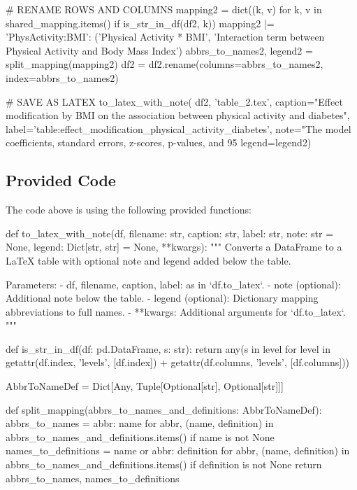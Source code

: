 \documentclass[11pt]{article}
\begin{document}
\begin{python}
# RENAME ROWS AND COLUMNS
mapping2 = dict((k, v) for k, v in shared_mapping.items() if is_str_in_df(df2, k))
mapping2 |= {
    'PhysActivity:BMI': ('Physical Activity * BMI', 'Interaction term between Physical Activity and Body Mass Index')
}
abbrs_to_names2, legend2 = split_mapping(mapping2)
df2 = df2.rename(columns=abbrs_to_names2, index=abbrs_to_names2)

# SAVE AS LATEX
to_latex_with_note(
    df2, 'table_2.tex',
    caption="Effect modification by BMI on the association between physical activity and diabetes", 
    label='table:effect_modification_physical_activity_diabetes',
    note="The model coefficients, standard errors, z-scores, p-values, and 95%
    legend=legend2)

\end{python}

\subsection{Provided Code}
The code above is using the following provided functions:

\begin{python}
def to_latex_with_note(df, filename: str, caption: str, label: str, note: str = None, legend: Dict[str, str] = None, **kwargs):
    """
    Converts a DataFrame to a LaTeX table with optional note and legend added below the table.

    Parameters:
    - df, filename, caption, label: as in `df.to_latex`.
    - note (optional): Additional note below the table.
    - legend (optional): Dictionary mapping abbreviations to full names.
    - **kwargs: Additional arguments for `df.to_latex`.
    """

def is_str_in_df(df: pd.DataFrame, s: str):
    return any(s in level for level in getattr(df.index, 'levels', [df.index]) + getattr(df.columns, 'levels', [df.columns]))

AbbrToNameDef = Dict[Any, Tuple[Optional[str], Optional[str]]]

def split_mapping(abbrs_to_names_and_definitions: AbbrToNameDef):
    abbrs_to_names = {abbr: name for abbr, (name, definition) in abbrs_to_names_and_definitions.items() if name is not None}
    names_to_definitions = {name or abbr: definition for abbr, (name, definition) in abbrs_to_names_and_definitions.items() if definition is not None}
    return abbrs_to_names, names_to_definitions

\end{python}
\end{document}

